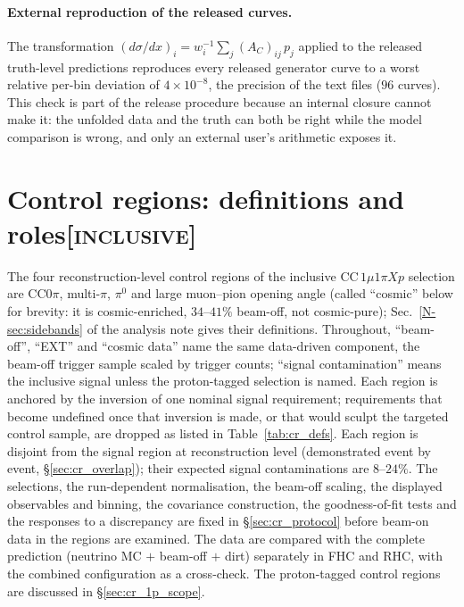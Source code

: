 \documentclass[11pt,a4paper]{article}
\newcommand{\noteref}[2]{#1~\ref{N-#2} of the analysis note}
\newcommand{\scopetag}[1]{\hfill{\normalfont\small\textsc{[#1]}}}
\begin{document}
\paragraph{External reproduction of the released curves.}
The transformation $\left(d\sigma/dx\right)_i = w_i^{-1}\sum_j (A_C)_{ij}\,p_j$
applied to the released truth-level predictions reproduces every released generator curve
to a worst relative per-bin deviation of $4\times10^{-8}$, the precision of the text files
($96$ curves). This check is part of the release
procedure because an internal closure cannot make it: the unfolded
data and the truth can both be right while the model comparison is wrong, and only an
external user's arithmetic exposes it.



\section[Control regions: definitions and roles]{Control regions: definitions and roles\scopetag{inclusive}}
\label{sec:request}

The four reconstruction-level control regions of the inclusive $\mathrm{CC}\,1\mu1\pi Xp$ selection
are CC$0\pi$, multi-$\pi$, $\pi^0$ and large muon--pion opening angle (called ``cosmic'' below for
brevity: it is cosmic-enriched, $34$--$41\%$ beam-off, not cosmic-pure); \noteref{Sec.}{sec:sidebands}
gives their definitions. Throughout, ``beam-off'', ``EXT'' and ``cosmic data'' name the same data-driven
component, the beam-off trigger sample scaled by trigger counts; ``signal contamination'' means the
inclusive signal unless the proton-tagged selection is named. Each region is anchored by the inversion
of one nominal signal requirement; requirements that become undefined once that inversion is made, or
that would sculpt the targeted control sample, are dropped as listed in Table~\ref{tab:cr_defs}. Each
region is disjoint from the signal region at reconstruction level (demonstrated event by event,
\S\ref{sec:cr_overlap}); their expected signal contaminations are $8$--$24\%$. The selections, the
run-dependent normalisation, the beam-off scaling, the displayed observables and binning, the covariance
construction, the goodness-of-fit tests and the responses to a discrepancy are fixed in
\S\ref{sec:cr_protocol} before beam-on data in the regions are examined. The data are compared with the
complete prediction (neutrino MC $+$ beam-off $+$ dirt) separately in FHC and RHC, with the combined
configuration as a cross-check. The proton-tagged control regions are discussed in
\S\ref{sec:cr_1p_scope}.
\end{document}
